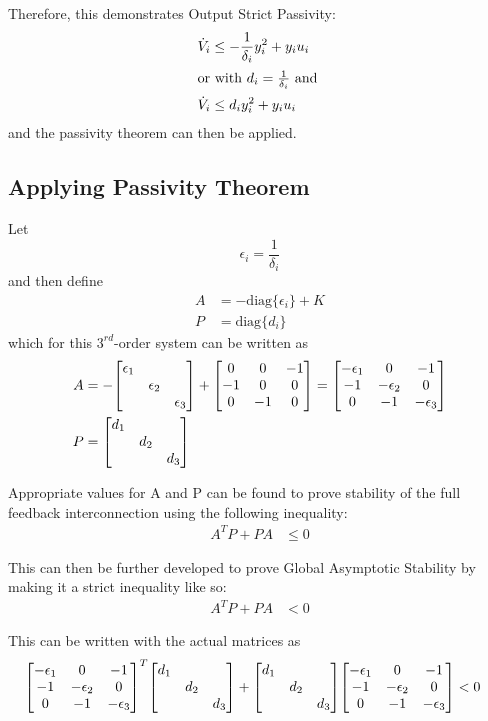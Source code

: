 \documentclass[letter]{article}
\numberwithin{equation}{section}
\begin{document}
Therefore, this demonstrates Output Strict Passivity:
\begin{align}
	\dot{V}_i &\leq -\frac{1}{\delta_i} y_i^2 + y_i u_i\\
	\intertext{or with $d_i = \frac{1}{\delta_i}$ and }
	\dot{V}_i &\leq d_i y_i^2 + y_i u_i
\end{align}
and the passivity theorem can then be applied.\\

\newpage
\subsection{Applying Passivity Theorem}
Let $$\epsilon_i = \frac{1}{\delta_i}$$ and then define
\begin{align}
	A &= - \text{diag}\{\epsilon_i\} + K\\
	P &= \text{diag}\{d_i\}
\end{align}
which for this $3^{rd}$-order system can be written as
\begin{align}
	A &= -\mqty[\dmat{\epsilon_1}{\epsilon_2}{\epsilon_3}] + \mqty[0 & 0 &-1\\ -1 & 0 & 0\\ 0 &-1 & 0] 
	= \mqty[-\epsilon_1 & 0 &-1\\
	-1 &-\epsilon_2 &0\\
	0	&-1	&-\epsilon_3]\\
	P &= \mqty[\dmat{d_1}{d_2}{d_3}]
\end{align}

Appropriate values for A and P can be found to prove stability of the full feedback interconnection using the following inequality:
\begin{align}
	A^T P + P A &\leq 0
\end{align}

This can then be further developed to prove Global Asymptotic Stability by making it a strict inequality like so:
\begin{align}
	A^T P + P A &< 0
\end{align}

This can be written with the actual matrices as
\begin{align}
	\mqty[-\epsilon_1 & 0 &-1\\
	-1 &-\epsilon_2 &0\\
	0	&-1	&-\epsilon_3]^T
	\mqty[\dmat{d_1}{d_2}{d_3}] +
	\mqty[\dmat{d_1}{d_2}{d_3}]
	\mqty[-\epsilon_1 & 0 &-1\\
	-1 &-\epsilon_2 &0\\
	0	&-1	&-\epsilon_3]
	&< 0
\end{align}
\end{document}
